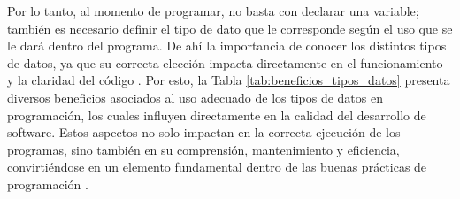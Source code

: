 Por lo tanto, al momento de programar, no basta con declarar una variable; también es necesario definir el tipo de dato que le corresponde según el uso que se le dará dentro del programa. De ahí la importancia de conocer los distintos tipos de datos, ya que su correcta elección impacta directamente en el funcionamiento y la claridad del código \cite{frem_ref1}. Por esto, la Tabla \ref{tab:beneficios_tipos_datos} presenta diversos beneficios asociados al uso adecuado de los tipos de datos en programación, los cuales influyen directamente en la calidad del desarrollo de software. Estos aspectos no solo impactan en la correcta ejecución de los programas, sino también en su comprensión, mantenimiento y eficiencia, convirtiéndose en un elemento fundamental dentro de las buenas prácticas de programación \cite{frem_ref1}.

